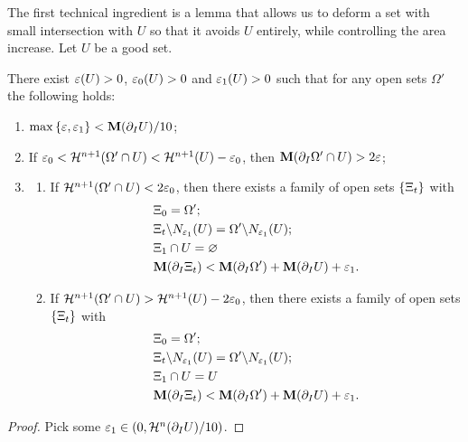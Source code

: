 The first technical ingredient is a lemma that allows us to deform a set with small intersection with $U$ so that it avoids $U$ entirely, while controlling the area increase. Let $U$ be a good set.
\begin{lemma}\label{lem:nested-sweepout-small-intersection}
    There exist $\varepsilon(U) > 0$, $\varepsilon_0(U) > 0$ and $\varepsilon_1(U) > 0$ such that for any open sets $\Omega'$ the following holds:
    \begin{enumerate}
        \item $\max\left\{\varepsilon, \varepsilon_1\right\} < \mathbf{M}(\partial_IU)/10$;
        \item If $\varepsilon_0 < \mathcal{H}^{n+1}(\Omega'\cap U) < \mathcal{H}^{n+1}(U) - \varepsilon_0$, then $\mathbf{M}(\partial_I\Omega'\cap U) > 2\varepsilon$;
        \item 
        \begin{enumerate}
            \item[(A)] If $\mathcal{H}^{n+1}(\Omega'\cap U) < 2\varepsilon_0$, then there exists a family of open sets $\left\{\Xi_t\right\}$ with 
            \begin{equation*}
                \begin{split}
                    &\Xi_0 = \Omega';\\
                    &\Xi_t\backslash N_{\varepsilon_1}(U) = \Omega'\backslash N_{\varepsilon_1}(U);\\
                    &\Xi_1\cap U = \varnothing\\
                    &\mathbf{M}(\partial_I\Xi_t) < \mathbf{M}(\partial_I\Omega') + \mathbf{M}(\partial_IU) + \varepsilon_1.
                \end{split}
            \end{equation*}
            \item[(B)] If $\mathcal{H}^{n+1}(\Omega'\cap U) > \mathcal{H}^{n+1}(U) - 2\varepsilon_0$, then there exists a family of open sets $\left\{\Xi_t\right\}$ with
            \begin{equation*}
                \begin{split}
                    &\Xi_0 = \Omega';\\
                    &\Xi_t\backslash N_{\varepsilon_1}(U) = \Omega'\backslash N_{\varepsilon_1}(U);\\
                    &\Xi_1\cap U = U\\
                    &\mathbf{M}(\partial_I\Xi_t) < \mathbf{M}(\partial_I\Omega') + \mathbf{M}(\partial_IU) + \varepsilon_1.
                \end{split}
            \end{equation*}
        \end{enumerate}
    \end{enumerate}
    \begin{proof}
        Pick some $\varepsilon_1 \in (0, \mathcal{H}^{n}(\partial_IU)/10)$. 
        

\end{proof}
\end{lemma}
